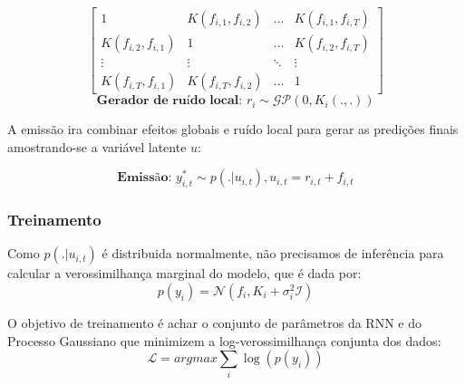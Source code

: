 \[
  \begin{bmatrix}
    1& K(f_{i,1},f_{i,2}) & \dots &K(f_{i,1},f_{i,T}) \\ 
    K(f_{i,2},f_{i,1}) &1  & \dots & K(f_{i,2},f_{i,T})\\ 
    \vdots &  \vdots  & \ddots & \vdots\\
    K(f_{i,T},f_{i,1})& K(f_{i,T},f_{i,2}) & \dots & 1 
  \end{bmatrix} 
\]
\[
    \textbf{Gerador de ruído local: }  r_i \sim \mathcal{GP} (0, K_i(.,.))
\]

A emissão ira combinar efeitos globais e ruído local para gerar as predições
finais amostrando-se a variável latente $u$:
  
\[
  \textbf{Emissão: }  y^*_{i,t} \sim p(. | u_{i,t}) , u_{i,t} = r_{i,t} + f_{i,t}  
\]

\subsubsection{Treinamento}

Como $p(. | u_{i,t})$ é distribuida normalmente, não precisamos de inferência para calcular a verossimilhança marginal do modelo, que é dada por: \\

\[
p(y_{i}) = \mathcal{N}(f_i,K_i + \sigma_i^2\mathcal{I})
\]

O objetivo de treinamento é achar o conjunto de parâmetros da RNN e do Processo Gaussiano que minimizem a log-verossimilhança conjunta dos dados: \\
\[
\mathcal{L} = argmax \sum_i{\log(p(y_i))}
\]



